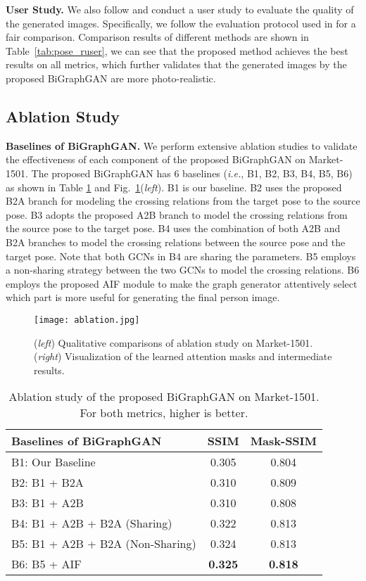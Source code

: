 \documentclass{bmvc2k}
\begin{document}
\noindent \textbf{User Study.}
We also follow \cite{ma2017pose,siarohin2018deformable,zhu2019progressive} and conduct a user study to evaluate the quality of the generated images.
Specifically, we follow the evaluation protocol used in \cite{zhu2019progressive} for a fair comparison.
Comparison results of different methods are shown in Table~\ref{tab:pose_ruser}, we can see that the proposed method achieves the best results on all metrics, which further validates that the generated images by the proposed BiGraphGAN are more photo-realistic.

\subsection{Ablation Study}
\noindent \textbf{Baselines of BiGraphGAN.}
We perform extensive ablation studies to validate the effectiveness of each component of the proposed BiGraphGAN on Market-1501. 
The proposed BiGraphGAN has 6 baselines (\emph{i.e.}, B1, B2, B3, B4, B5, B6) as shown in Table \ref{tab:ablation} and Fig.~\ref{fig:ablation}(\textit{left}).
B1 is our baseline.  
B2 uses the proposed B2A branch for modeling the crossing relations from the target pose to the source pose.
B3 adopts the proposed A2B branch to model the crossing relations from the source pose to the target pose.
B4 uses the combination of both A2B and B2A branches to model the crossing relations between the source pose and the target pose.
Note that both GCNs in B4 are sharing the parameters.
B5 employs a non-sharing strategy between the two GCNs to model the crossing relations.
B6 employs the proposed AIF module to make the graph generator attentively select which part is more useful for generating the final person image.

\begin{figure}[!t]
	\centering
	\texttt{[image: ablation.jpg]}
	\caption{(\textit{left}) Qualitative comparisons of ablation study on Market-1501. (\textit{right}) Visualization of the learned attention masks and intermediate results.}
	\label{fig:ablation}
\end{figure}

\begin{table}[!t]
	\centering
	\caption{Ablation study of the proposed BiGraphGAN on Market-1501. For both metrics, higher is better.}
	\begin{tabular}{lcc} \toprule
		Baselines of BiGraphGAN & SSIM  & Mask-SSIM     \\ \midrule
		B1: Our Baseline & 0.305 & 0.804 \\ 
		B2: B1 + B2A     & 0.310 & 0.809 \\
		B3: B1 + A2B     & 0.310 & 0.808 \\
		B4: B1 + A2B + B2A (Sharing) & 0.322 & 0.813 \\
		B5: B1 + A2B + B2A (Non-Sharing) & 0.324 & 0.813 \\
		B6: B5 + AIF & \textbf{0.325} & \textbf{0.818} \\
		\bottomrule	
	\end{tabular}
	\label{tab:ablation}
\end{table}
\end{document}
